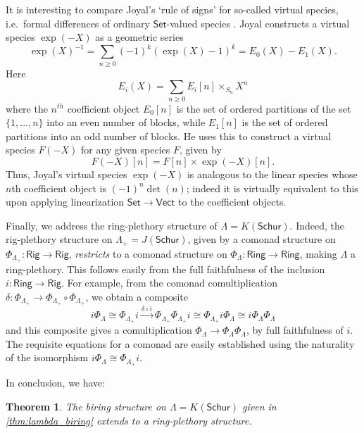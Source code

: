 \documentclass[12pt,reqno]{amsart}
\theoremstyle{plain}
\newtheorem{thm}{Theorem}
\theoremstyle{definition}
\theoremstyle{remark}
\newcommand{\maps}{\colon}
\newcommand{\namedcat}[1]{\mathsf{#1}}
\newcommand{\Rig}{\namedcat{Rig}}
\newcommand{\Ring}{\namedcat{Ring}}
\newcommand{\Set}{\namedcat{Set}}
\newcommand{\Schur}{\namedcat{Schur}}
\newcommand{\Vect}{\namedcat{Vect}}
\numberwithin{thm}{section}
\begin{document}
It is interesting to compare Joyal's `rule of signs' for so-called virtual species, i.e.\ formal differences of ordinary $\Set$-valued species \cite{AnalyticFunctors}. Joyal constructs a virtual species $\exp(-X)$ as a geometric series 
\[
\exp(X)^{-1} = \sum_{n \geq 0} (-1)^k (\exp(X)-1)^k = E_0(X) - E_1(X).
\]
Here
\[   E_i(X) = \sum_{n \ge 0} E_i[n] \times_{S_n} X^n \]
where the $n^{th}$ coefficient object $E_0[n]$ is the set of ordered partitions of the set $\{1, \ldots, n\}$ into an even number of blocks, while $E_1[n]$ is the set of ordered partitions into an odd number of blocks. He uses this to construct a virtual species  $F(-X)$ for any given species $F$, given by
\[
F(-X)[n] = F[n] \times \exp(-X)[n].
\]
Thus, Joyal's virtual species $\exp(-X)$ is analogous to the linear species whose $n$th coefficient object is $(-1)^n \det(n)$; indeed it is virtually equivalent to this upon applying linearization $\Set \to \Vect$ to the coefficient objects.

Finally, we address the ring-plethory structure of $\Lambda = K(\Schur)$. Indeed, the rig-plethory structure on $\Lambda_+ = J(\Schur)$, given by a comonad structure on $\Phi_{\Lambda_+} \maps \Rig \to \Rig$, \emph{restricts} to a comonad structure on $\Phi_\Lambda \maps \Ring \to \Ring$, making $\Lambda$ a ring-plethory. This follows easily from the full faithfulness of the inclusion $i \maps \Ring \to \Rig$. For example, from the comonad comultiplication $\delta \maps \Phi_{\Lambda_+} \to \Phi_{\Lambda_+} \circ \Phi_{\Lambda_+}$, we obtain a composite 
\[
    i \Phi_\Lambda \cong \Phi_{\Lambda_+} i \xrightarrow{\delta \circ i} \Phi_{\Lambda_+} \Phi_{\Lambda_+} i \cong \Phi_{\Lambda_+} i \Phi_\Lambda \cong i \Phi_\Lambda \Phi_\Lambda
\] 
and this composite gives a comultiplication $\Phi_\Lambda \to \Phi_\Lambda \Phi_\Lambda$, by full faithfulness of $i$. The requisite equations for a comonad are easily established using the naturality of the isomorphism $i \Phi_\Lambda \cong \Phi_{\Lambda_+} i$. 

In conclusion, we have:

\begin{thm}
\label{thm:lambda_plethory}
    The biring structure on $\Lambda = K(\Schur)$ given in \cref{thm:lambda_biring} extends to a ring-plethory structure. 
\end{thm} 
\end{document}
